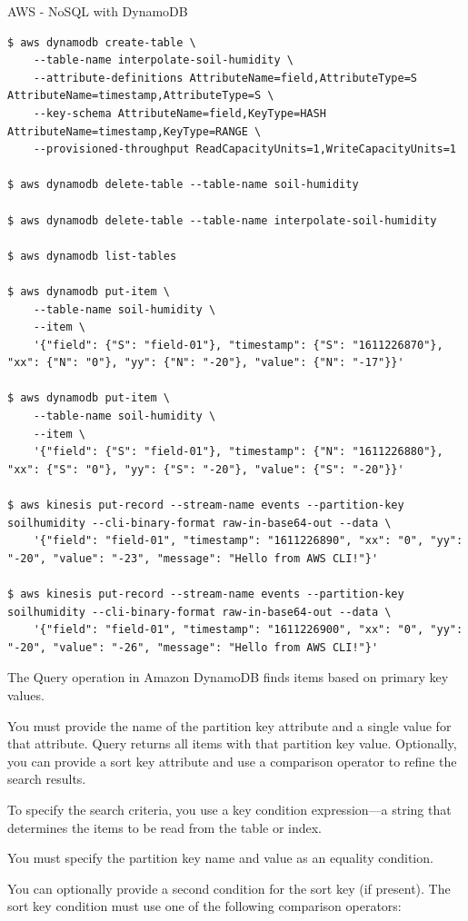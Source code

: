 \begin{frame}{AWS - NoSQL with DynamoDB}
\begin{lstlisting}
$ aws dynamodb create-table \
    --table-name interpolate-soil-humidity \
    --attribute-definitions AttributeName=field,AttributeType=S AttributeName=timestamp,AttributeType=S \
    --key-schema AttributeName=field,KeyType=HASH AttributeName=timestamp,KeyType=RANGE \
    --provisioned-throughput ReadCapacityUnits=1,WriteCapacityUnits=1

$ aws dynamodb delete-table --table-name soil-humidity

$ aws dynamodb delete-table --table-name interpolate-soil-humidity

$ aws dynamodb list-tables

$ aws dynamodb put-item \
    --table-name soil-humidity \
    --item \
    '{"field": {"S": "field-01"}, "timestamp": {"S": "1611226870"}, "xx": {"N": "0"}, "yy": {"N": "-20"}, "value": {"N": "-17"}}'

$ aws dynamodb put-item \
    --table-name soil-humidity \
    --item \
    '{"field": {"S": "field-01"}, "timestamp": {"N": "1611226880"}, "xx": {"S": "0"}, "yy": {"S": "-20"}, "value": {"S": "-20"}}'
    
$ aws kinesis put-record --stream-name events --partition-key soilhumidity --cli-binary-format raw-in-base64-out --data \
    '{"field": "field-01", "timestamp": "1611226890", "xx": "0", "yy": "-20", "value": "-23", "message": "Hello from AWS CLI!"}'

$ aws kinesis put-record --stream-name events --partition-key soilhumidity --cli-binary-format raw-in-base64-out --data \
    '{"field": "field-01", "timestamp": "1611226900", "xx": "0", "yy": "-20", "value": "-26", "message": "Hello from AWS CLI!"}'
\end{lstlisting}



The Query operation in Amazon DynamoDB finds items based on primary key values.

You must provide the name of the partition key attribute and a single value for that attribute. Query returns all items with that partition key value. Optionally, you can provide a sort key attribute and use a comparison operator to refine the search results. 

To specify the search criteria, you use a key condition expression—a string that determines the items to be read from the table or index.

You must specify the partition key name and value as an equality condition.

You can optionally provide a second condition for the sort key (if present). The sort key condition must use one of the following comparison operators:


\end{frame}
